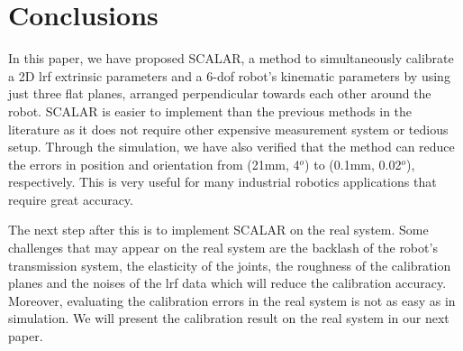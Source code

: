 \section{Conclusions}
\label{sec:conclusions}

In this paper, we have proposed SCALAR, a method to simultaneously calibrate a 2D \ac{lrf} extrinsic parameters and a 6-\ac{dof} robot's kinematic parameters by using just three flat planes, arranged perpendicular towards each other around the robot. SCALAR is easier to implement than the previous methods in the literature as it does not require other expensive measurement system or tedious setup. Through the simulation, we have also verified that the method can reduce the errors in position and orientation from (21mm, 4$^o$) to (0.1mm, 0.02$^o$), respectively. This is very useful for many industrial robotics applications that require great accuracy. 

The next step after this is to implement SCALAR on the real system. Some challenges that may appear on the real system are the backlash of the robot's transmission system, the elasticity of the joints, the roughness of the calibration planes and the noises of the \ac{lrf} data which will reduce the calibration accuracy. Moreover, evaluating the calibration errors in the real system is not as easy as in simulation. We will present the calibration result on the real system in our next paper. 